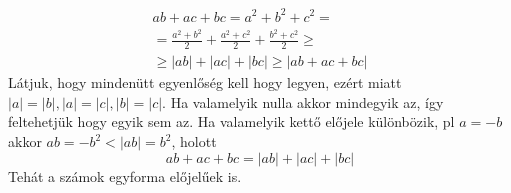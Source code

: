    \begin{align*}
   ab+ac+bc=a^{2}+b^{2}+c^{2}=\\ 
   =\frac{a^{2}+b^{2}}{2}+\frac{a^{2}+c^{2}}{2}+\frac{b^{2}+c^{2}}{2}\ge \\
   \ge |ab|+|ac|+|bc|\ge |ab+ac+bc|
   \end{align*}
   Látjuk, hogy mindenütt egyenlőség kell hogy legyen, ezért 
    miatt $|a|=|b|,|a|=|c|,|b|=|c|$. Ha valamelyik nulla 
   akkor mindegyik az, így feltehetjük hogy egyik sem az. Ha valamelyik kettő előjele 
   különbözik, pl $a=-b$ akkor $ab=-b^2<|ab|=b^2$, holott
   $$
   ab+ac+bc=|ab|+|ac|+|bc|
   $$
   Tehát a számok egyforma előjelűek is.
